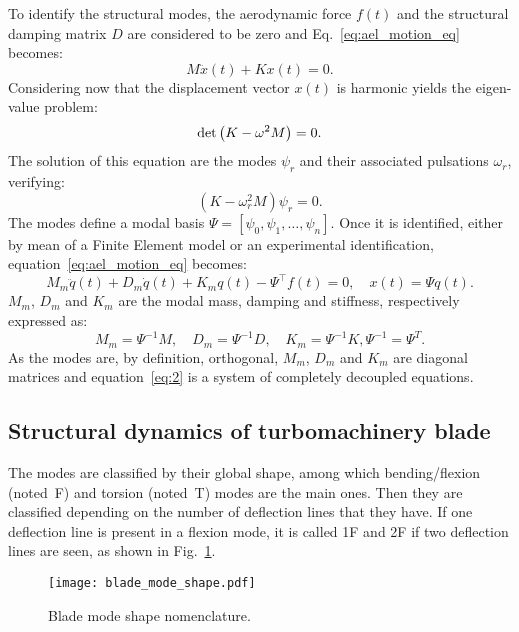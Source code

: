 To identify the structural modes, the aerodynamic force $f(t)$ and
the structural damping matrix $D$ are considered to be zero
and Eq.~\eqref{eq:ael_motion_eq} becomes:
\begin{equation}
	M \ddot{x}(t) + K x(t) = 0.
	\label{eq:ael_motion_eq_free_response}
\end{equation}
Considering now that the displacement vector $x(t)$ is harmonic
yields the eigen-value problem:
\begin{equation}
	\mdet \left(K - \omega^2 M  \right) = 0.
	\label{eq:ael_motion_eq_eigen_value}
\end{equation}
The solution of this equation are the modes $\psi_r$
and their associated pulsations $\omega_r$, verifying:
\begin{equation}
	\left(K - \omega_r^2 M  \right) \psi_r = 0.
\end{equation}
The modes define a modal basis 
$\Psi = [\psi_0, \psi_1, \dots, \psi_n]$.
Once it
is identified, either by mean of a Finite
Element model or an experimental identification, 
equation~\ref{eq:ael_motion_eq} becomes:
\begin{equation}
  \label{eq:2}
  M_m \ddot{q}(t) + D_m \dot{q}(t) + K_m q (t) - \Psi^\top f(t)=0, \quad x(t) = \Psi q(t).
\end{equation}
$M_m$, $D_m$ and $K_m$ are the modal mass, 
damping and stiffness, respectively expressed as:
\begin{equation}
    M_m = \Psi ^{-1} M, \quad D_m = \Psi ^{-1} D, \quad K_m = \Psi ^{-1} K, \Psi ^{-1}  = \Psi ^{T}.
\end{equation}
As the modes are, by definition, orthogonal,
$M_m$, $D_m$ and $K_m$ are diagonal matrices and
equation~\eqref{eq:2} is a system of completely decoupled equations.

\subsection{Structural dynamics of turbomachinery blade}
\label{sub:structural_dynamics_of_turbomachinery_blade}

The modes are classified by their global shape, among which 
bending/flexion (noted~F) and torsion (noted~T) 
modes are the main ones. Then they are classified
depending on the number of deflection lines that they
have. If one deflection line is present in a flexion 
mode, it is called 1F and 2F if two deflection lines are
seen, as shown in Fig.~\ref{fig:blade_mode_shape}.
\begin{figure}[htp]
  \centering
  \texttt{[image: blade\_mode\_shape.pdf]}
  \caption{Blade mode shape nomenclature.}
  \label{fig:blade_mode_shape}
\end{figure}

